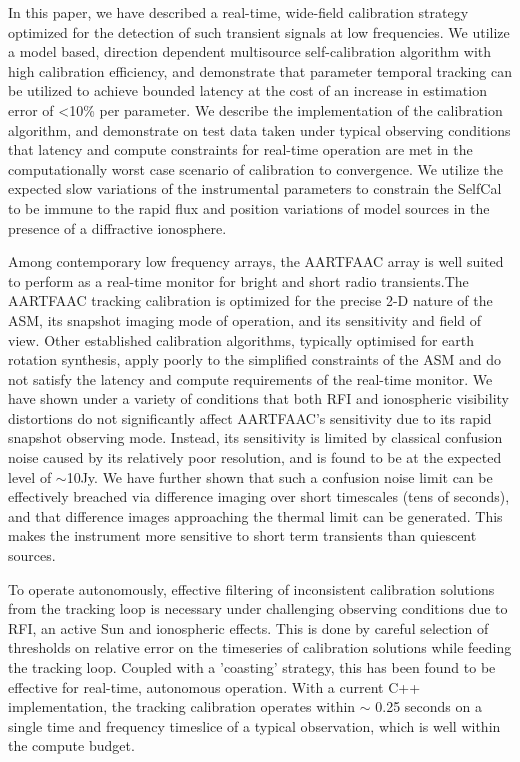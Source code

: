 \documentclass{aa}
\begin{document}
In this  paper, we have  described a real-time, wide-field  calibration strategy
optimized for  the detection of such  transient signals at  low frequencies.  We
utilize  a   model  based,  direction   dependent  multisource  self-calibration
algorithm  with  high calibration  efficiency,  and  demonstrate that  parameter
temporal tracking can  be utilized to achieve bounded latency at  the cost of an
increase  in  estimation  error  of   <10\%  per  parameter.   We  describe  the
implementation of the calibration algorithm,  and demonstrate on test data taken
under  typical observing  conditions that  latency and  compute  constraints for
real-time  operation are  met  in  the computationally  worst  case scenario  of
calibration  to convergence.   We utilize  the expected  slow variations  of the
instrumental parameters to constrain the SelfCal  to be immune to the rapid flux
and  position variations  of  model sources  in  the presence  of a  diffractive
ionosphere.  

Among contemporary  low frequency arrays, the  AARTFAAC array is  well suited to
perform  as  a real-time  monitor  for  bright  and short  radio  transients.The
AARTFAAC tracking  calibration is  optimized for the  precise 2-D nature  of the
ASM, its  snapshot imaging mode of  operation, and its sensitivity  and field of
view. Other  established calibration  algorithms, typically optimised  for earth
rotation synthesis, apply poorly to the simplified constraints of the ASM and do
not satisfy the  latency and compute requirements of  the real-time monitor.  We
have  shown  under  a  variety  of  conditions that  both  RFI  and  ionospheric
visibility distortions  do not  significantly affect AARTFAAC's  sensitivity due
to its rapid  snapshot observing  mode.  Instead, its  sensitivity is  limited by
classical confusion noise caused by its relatively poor resolution, and is found
to be at  the expected level of  $\sim$10Jy.  We have further shown  that such a
confusion noise  limit can be  effectively breached via difference  imaging over
short timescales  (tens of seconds),  and that difference images  approaching the
thermal  limit can be  generated. This  makes the  instrument more  sensitive to
short term transients than quiescent sources.

To  operate  autonomously,   effective  filtering  of  inconsistent  calibration
solutions  from  the tracking  loop  is  necessary  under challenging  observing
conditions due to  RFI, an active Sun and ionospheric effects.   This is done by
careful  selection  of  thresholds  on  relative  error  on  the  timeseries  of
calibration solutions while feeding the tracking loop. Coupled with a 'coasting'
strategy,  this  has  been  found  to be  effective  for  real-time,  autonomous
operation. With a current  C++ implementation, the tracking calibration operates
within $\sim$ 0.25 seconds on a single time and frequency timeslice of a typical
observation, which is well within the compute budget.
\end{document}

